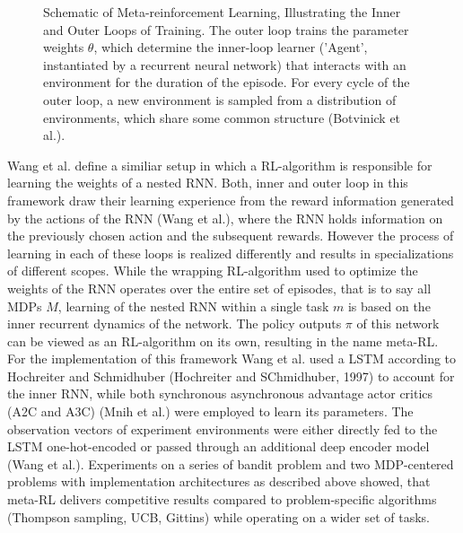 \documentclass[letterpaper, 10 pt, conference]{ieeeconf}  %
\begin{document}
\begin{figure}[thpb]
        \centering
  \caption{Schematic of Meta-reinforcement Learning, Illustrating the Inner and Outer Loops of Training. The
  outer loop trains the parameter weights $\theta$, which determine the inner-loop learner (’Agent’, instantiated by a recurrent
  neural network) that interacts with an environment for the duration of the episode. For every cycle of the outer loop, a new
  environment is sampled from a distribution of environments, which share some common structure (Botvinick et al.).}
        \label{figurelabel}
     \end{figure}

Wang et al. define a similiar setup in which a RL-algorithm is responsible for learning the weights of a nested RNN. Both, inner and outer loop 
in this framework draw their learning experience from the reward information generated by the actions of the RNN (Wang et al.), where 
the RNN holds information on the previously chosen action and the subsequent rewards. However the process of learning
in each of these loops is realized differently and results in specializations of different scopes. While the wrapping RL-algorithm used to 
optimize the weights of the RNN operates over the entire set of episodes, that is to say all MDPs $M$, learning of the nested RNN 
within a single task $m$ is based on the inner recurrent dynamics of the network. The policy outputs $\pi$ of this network can 
be viewed as an RL-algorithm on its own, resulting in the name meta-RL. For the implementation of this framework Wang et al. 
used a LSTM according to Hochreiter and Schmidhuber (Hochreiter and SChmidhuber, 1997) to account for the inner RNN, while both synchronous 
asynchronous advantage actor critics (A2C and A3C) (Mnih et al.) were employed to learn its parameters. The observation vectors of experiment environments
were either directly fed to the LSTM one-hot-encoded or passed through an additional deep encoder model (Wang et al.). 
Experiments on a series of bandit problem and two
MDP-centered problems with implementation architectures as described above showed, that meta-RL delivers 
competitive results compared to problem-specific algorithms (Thompson sampling, UCB, Gittins) while operating on a 
wider set of tasks. \newline
\end{document}
